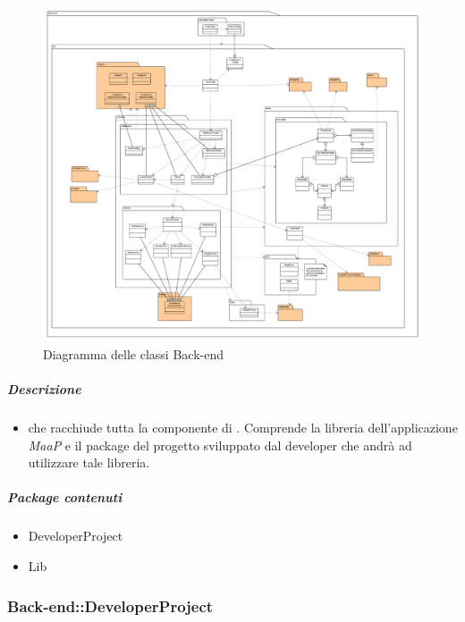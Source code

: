 		\begin{figure}[H] 
			\begin{center} 
				\includegraphics[width=\textwidth]{uml/classi/Back-end.png}  
				\caption{Diagramma delle classi Back-end}
			\end{center}  
		\end{figure} 
		
	\subparagraph{Descrizione} 
		\begin{itemize}
		\item[]  che racchiude tutta la componente di . Comprende la libreria dell'applicazione \textit{MaaP} e il package del progetto sviluppato dal developer che andrà ad utilizzare tale libreria.
		\end{itemize} 
		\subparagraph{Package contenuti} 
		\begin{itemize}
				\item DeveloperProject
				\item Lib
		\end{itemize}
	\subsubsection{Back-end::DeveloperProject}
